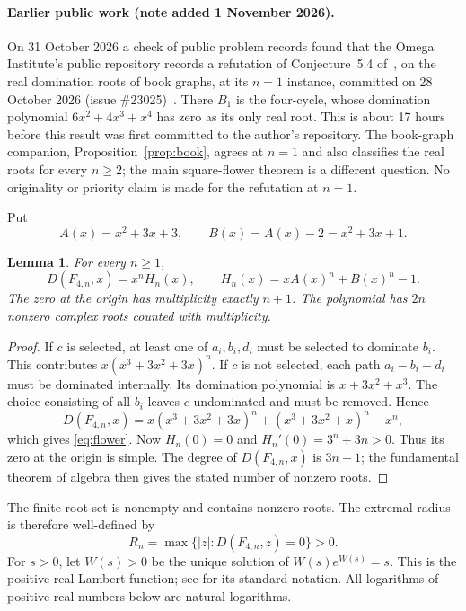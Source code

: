 \documentclass[11pt,a4paper]{article}
\newtheorem{lemma}[theorem]{Lemma}
\begin{document}
\paragraph{Earlier public work (note added 1 November 2026).}
On 31 October 2026 a check of public problem records found that the Omega
Institute's public repository records a refutation of Conjecture~5.4
of~\cite{rather2026}, on the real domination roots of book graphs, at its
$n=1$ instance, committed on 28 October 2026 (issue \#23025)~\cite{omega23025}.
There $B_1$ is the four-cycle, whose domination polynomial
$6x^2+4x^3+x^4$ has zero as its only real root. This is about 17 hours before
this result was first committed to the author's repository. The book-graph
companion, Proposition~\ref{prop:book}, agrees at $n=1$ and also classifies
the real roots for every $n\ge2$; the main square-flower theorem is a
different question. No originality or priority claim is made for the
refutation at $n=1$.

Put
\[
 A(x)=x^2+3x+3,\qquad B(x)=A(x)-2=x^2+3x+1.
\]
\begin{lemma}\label{lem:count}
For every $n\ge1$,
\begin{equation}\label{eq:flower}
 D(F_{4,n},x)=x^nH_n(x),\qquad H_n(x)=xA(x)^n+B(x)^n-1.
\end{equation}
The zero at the origin has multiplicity exactly $n+1$. The polynomial has
$2n$ nonzero complex roots counted with multiplicity.
\end{lemma}
\begin{proof}
If $c$ is selected, at least one of $a_i,b_i,d_i$ must be selected to dominate
$b_i$. This contributes $x(x^3+3x^2+3x)^n$.
If $c$ is not selected, each path $a_i-b_i-d_i$ must be dominated internally.
Its domination polynomial is $x+3x^2+x^3$. The choice consisting of all $b_i$
leaves $c$ undominated and must be removed. Hence
\[
 D(F_{4,n},x)=x(x^3+3x^2+3x)^n+(x^3+3x^2+x)^n-x^n,
\]
which gives \eqref{eq:flower}. Now $H_n(0)=0$ and
$H_n'(0)=3^n+3n>0$. Thus its zero at the origin is simple.
The degree of $D(F_{4,n},x)$ is $3n+1$; the fundamental theorem of algebra
then gives the stated number of nonzero roots.
\end{proof}

The finite root set is nonempty and contains nonzero roots. The extremal radius is therefore well-defined by
\[
 R_n=\max\{|z|:D(F_{4,n},z)=0\}>0.
\]
For $s>0$, let $W(s)>0$ be the unique solution of $W(s)e^{W(s)}=s$.
This is the positive real Lambert function; see \cite{corless1996} for its standard notation.
All logarithms of positive real numbers below are natural logarithms.
\end{document}
